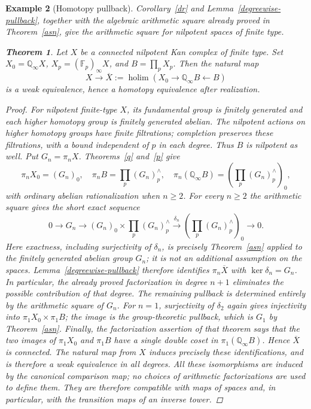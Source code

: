 \documentclass[11pt,a4paper]{article}
\newtheorem{theorem}{Theorem}[section] %
\newtheorem{example}[theorem]{Example}
\begin{document}
\begin{example}[Homotopy pullback]
Corollary~\ref{dr} and Lemma~\ref{degreewise-pullback}, together with
the algebraic arithmetic square already proved in
Theorem~\ref{asn}, give the arithmetic square for nilpotent spaces of
finite type.
\begin{theorem}\label{space-arithmetic}
Let $X$ be a connected nilpotent Kan complex of finite type.  Set
$X_0=\mathbb Q_\infty X$, $X_p=(\mathbb F_p)_\infty X$, and
$B=\prod_pX_p$.  Then the natural map
\[
 X\longrightarrow\overline X
 :=\operatorname{holim}(X_0\longrightarrow\mathbb Q_\infty B
 \longleftarrow B)
\]
is a weak equivalence, hence a homotopy equivalence after realization.
\end{theorem}
\begin{proof}
For nilpotent finite-type $X$, its fundamental group is finitely
generated and each higher homotopy group is finitely generated abelian.
The nilpotent actions on higher homotopy groups have finite filtrations;
completion preserves these filtrations, with a bound independent of $p$
in each degree.  Thus $B$ is nilpotent as well.  Put $G_n=\pi_nX$.
Theorems~\ref{q} and~\ref{p} give
\[
 \pi_nX_0=(G_n)_0,\quad
 \pi_nB=\prod_p(G_n)_p^{\wedge},\quad
 \pi_n(\mathbb Q_\infty B)=\left(\prod_p(G_n)_p^{\wedge}\right)_0,
\]
with ordinary abelian rationalization when $n\geq2$.
For every $n\geq2$ the arithmetic square gives the short exact sequence
\[
 0\longrightarrow G_n\longrightarrow
 (G_n)_0\times\prod_p(G_n)_p^{\wedge}
 \xrightarrow{\delta_n}\left(\prod_p(G_n)_p^{\wedge}\right)_0
 \longrightarrow0.
\]
Here exactness, including surjectivity of $\delta_n$, is precisely
Theorem~\ref{asn} applied to the finitely generated abelian group
$G_n$; it is not an additional assumption on the spaces.
Lemma~\ref{degreewise-pullback} therefore identifies
$\pi_n\overline X$ with $\ker\delta_n=G_n$.
In particular, the already proved factorization in degree $n+1$
eliminates the possible contribution of that degree.  The remaining
pullback is determined entirely by the arithmetic square of $G_n$.
For $n=1$, surjectivity of $\delta_2$ again gives injectivity into
$\pi_1X_0\times\pi_1B$; the image is the group-theoretic pullback,
which is $G_1$ by Theorem~\ref{asn}.
Finally, the factorization assertion of that theorem says that the two
images of $\pi_1X_0$ and $\pi_1B$ have a single double coset in
$\pi_1(\mathbb Q_\infty B)$.  Hence $\overline X$ is connected.
The natural map from $X$ induces precisely these identifications, and
is therefore a weak equivalence in all degrees.
All these isomorphisms are induced by the canonical comparison map;
no choices of arithmetic factorizations are used to define them.
They are therefore compatible with maps of spaces and, in particular,
with the transition maps of an inverse tower.
\end{proof}
\end{example}
\end{document}
